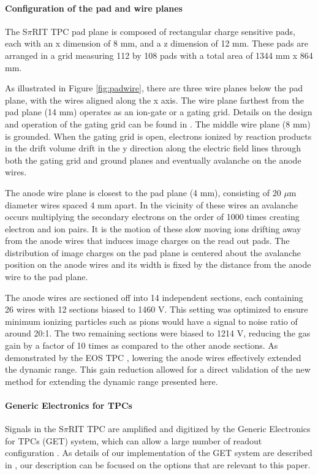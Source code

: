 \documentclass[review]{elsarticle}
\begin{document}
\paragraph{Configuration of the pad and wire planes} 
The S$\pi$RIT TPC pad plane is composed of rectangular charge sensitive pads, each with an x dimension of 8 mm, and a z dimension of 12 mm. These pads are arranged in a grid measuring 112 by 108 pads with a total area of 1344 mm x 864 mm.

As illustrated in Figure \ref{fig:padwire}, there are three wire planes below the pad plane, with the wires aligned along the x axis. The wire plane farthest from the pad plane (14 mm) operates as an ion-gate or a gating grid. Details on the design and operation of the gating grid can be found in \cite{suwat}. The middle wire plane (8 mm) is grounded. When the gating grid is open, electrons ionized by reaction products in the drift volume drift in the y direction along the electric field lines through both the gating grid and ground planes and eventually avalanche on the anode wires. 

The anode wire plane is closest to the pad plane (4 mm), consisting of 20 $\mu$m diameter wires spaced 4 mm apart. In the vicinity of these wires an avalanche occurs multiplying the secondary electrons on the order of 1000 times creating electron and ion pairs. It is the motion of these slow moving ions drifting away from the anode wires that induces image charges on the read out pads. The distribution of image charges on the pad plane is centered about the avalanche position on the anode wires and its width is fixed by the distance from the anode wire to the pad plane. 

The anode wires are sectioned off into 14 independent sections, each containing 26 wires with 12 sections biased to 1460 V. This setting was optimized to ensure minimum ionizing particles such as pions would have a signal to noise ratio of around 20:1. The two remaining sections were biased to 1214 V, reducing the gas gain by a factor of 10 times as compared to the other anode sections. As demonstrated by the EOS TPC \citep{eos}, lowering the anode wires effectively extended the dynamic range.  This gain reduction allowed for a direct validation of the new method for extending the dynamic range presented here. 

\paragraph{Generic Electronics for TPCs}
Signals in the S$\pi$RIT TPC are amplified and digitized by the Generic Electronics for TPCs (GET) system, which can allow a large number of readout configuration \cite{get}. As details of our implementation of the GET system are described in \citep{aki}, our description can be focused on the options that are relevant to this paper.
\end{document}
